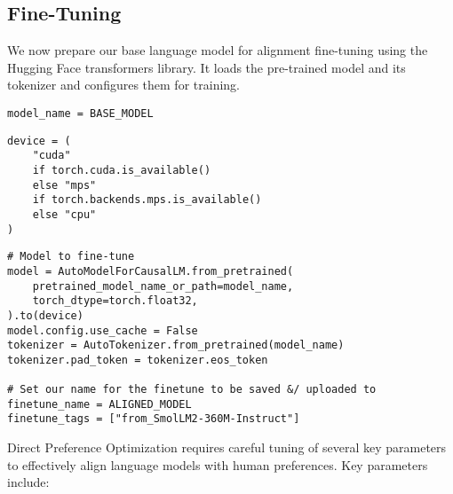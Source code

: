 \subsection{Fine-Tuning}

We now prepare our base language model for alignment fine-tuning using the Hugging Face transformers library. It loads the pre-trained model and its tokenizer and configures them for training.

\begin{verbatim}
model_name = BASE_MODEL
\end{verbatim}

\begin{verbatim}
device = (
    "cuda"
    if torch.cuda.is_available()
    else "mps"
    if torch.backends.mps.is_available()
    else "cpu"
)
\end{verbatim}

\begin{verbatim}
# Model to fine-tune
model = AutoModelForCausalLM.from_pretrained(
    pretrained_model_name_or_path=model_name,
    torch_dtype=torch.float32,
).to(device)
model.config.use_cache = False
tokenizer = AutoTokenizer.from_pretrained(model_name)
tokenizer.pad_token = tokenizer.eos_token

# Set our name for the finetune to be saved &/ uploaded to
finetune_name = ALIGNED_MODEL
finetune_tags = ["from_SmolLM2-360M-Instruct"]
\end{verbatim}

Direct Preference Optimization requires careful tuning of several key parameters to effectively align language models with human preferences. Key parameters include:

